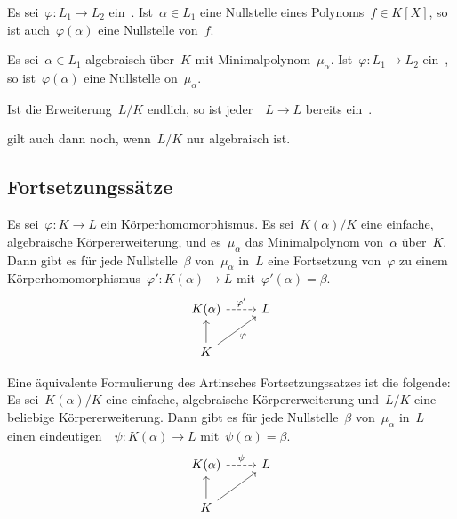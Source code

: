 \begin{lemma}
  Es sei~$\varphi \colon L_1 \to L_2$ ein~.
  Ist~$\alpha \in L_1$ eine Nullstelle eines Polynoms~$f \in K[X]$, so ist auch~$\varphi(\alpha)$ eine Nullstelle von~$f$.
\end{lemma}

\begin{corollary}
  Es sei~$\alpha \in L_1$ algebraisch über~$K$ mit Minimalpolynom~$\mu_\alpha$.
  Ist~$\varphi \colon L_1 \to L_2$ ein~, so ist~$\varphi(\alpha)$ eine Nullstelle on~$\mu_\alpha$.
\end{corollary}

\begin{proposition}
  \label{homos are autos for finite extension}
  Ist die Erweiterung~$L/K$ endlich, so ist jeder~~$L \to L$ bereits ein~.
\end{proposition}

\begin{remark}
   gilt auch dann noch, wenn~$L/K$ nur algebraisch ist.
\end{remark}



\subsection{Fortsetzungssätze}

\begin{theorem}
  Es sei~$\varphi \colon K \to L$ ein Körperhomomorphismus.
  Es sei~$K(\alpha)/K$ eine einfache, algebraische Körpererweiterung, und es~$\mu_\alpha$ das Minimalpolynom von~$\alpha$ über~$K$.
  Dann gibt es für jede Nullstelle~$\beta$ von~$\mu_\alpha$ in~$L$ eine Fortsetzung von~$\varphi$ zu einem Körperhomomorphismus~$\varphi' \colon K(\alpha) \to L$ mit~$\varphi'(\alpha) = \beta$.
  \[
    \begin{tikzcd}
      K(\alpha)
      \arrow[dashed]{r}[above]{\varphi'}
      &
      L
      \\
      K
      \arrow{u}
      \arrow{ur}[below right]{\varphi}
      &
      {}
    \end{tikzcd}
  \]
\end{theorem}

\begin{remark}
  Eine äquivalente Formulierung des Artinsches Fortsetzungssatzes ist die folgende:
  Es sei~$K(\alpha)/K$ eine einfache, algebraische Körpererweiterung und~$L/K$ eine beliebige Körpererweiterung.
  Dann gibt es für jede Nullstelle~$\beta$ von~$\mu_\alpha$ in~$L$ einen eindeutigen~~$\psi \colon K(\alpha) \to L$ mit~$\psi(\alpha) = \beta$.
  \[
    \begin{tikzcd}
      K(\alpha)
      \arrow[dashed]{r}[above]{\psi}
      &
      L
      \\
      K
      \arrow{u}
      \arrow{ur}
      &
      {}
    \end{tikzcd}
  \]
\end{remark}

